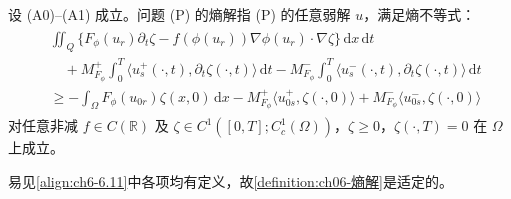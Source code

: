 \documentclass[../../main.tex]{subfiles}%
\begin{document}
\begin{definition}\label{definition:ch06-熵解}
设 (A0)--(A1) 成立。问题 (P) 的熵解指 (P) 的任意弱解 $u$，满足熵不等式：
\begin{align}
\begin{aligned}
&\iint_Q\{F_\phi(u_r)\partial_t\zeta-f(\phi(u_r))\nabla\phi(u_r)\cdot\nabla\zeta\}\,\mathrm{d}x\,\mathrm{d}t\\
&\quad+M^+_{F_\phi}\int_0^T\langle u^+_s(\cdot,t),\partial_t\zeta(\cdot,t)\rangle\,\mathrm{d}t
-M^-_{F_\phi}\int_0^T\langle u^-_s(\cdot,t),\partial_t\zeta(\cdot,t)\rangle\,\mathrm{d}t\\
&\geqslant -\int_\Omega F_\phi(u_{0r})\zeta(x,0)\,\mathrm{d}x
-M^+_{F_\phi}\langle u^+_{0s},\zeta(\cdot,0)\rangle
+M^-_{F_\phi}\langle u^-_{0s},\zeta(\cdot,0)\rangle
\end{aligned} \label{align:ch6-6.11}
\end{align}
对任意非减 $f\in C(\mathbb{R})$ 及 $\zeta\in C^1([0,T];C^1_c(\Omega))$，$\zeta\geqslant0$，$\zeta(\cdot,T)=0$ 在 $\Omega$ 上成立。
\end{definition}

易见\eqref{align:ch6-6.11}中各项均有定义，故\cref{definition:ch06-熵解}是适定的。
\end{document}
